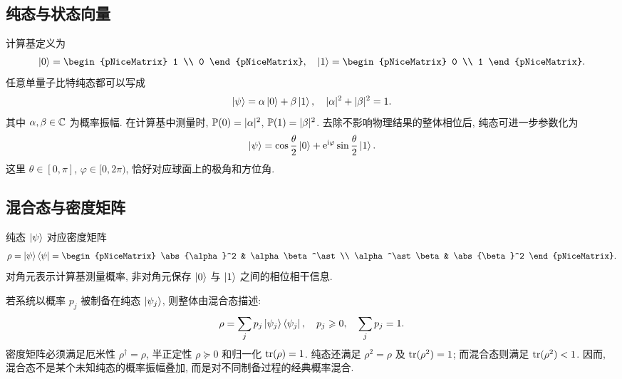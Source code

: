 \documentclass[a4paper]{ctexart}
\begin{document}
\subsection{纯态与状态向量}

计算基定义为
\begin{align}
    \ket{0}=\begin{pNiceMatrix}
                1 \\
                0
            \end{pNiceMatrix}, \q \ket{1}=\begin{pNiceMatrix}
                                              0 \\
                                              1
                                          \end{pNiceMatrix}.
\end{align}
任意单量子比特纯态都可以写成
\begin{align}
    \ket{\psi}=\alpha\ket{0}+\beta\ket{1}, \quad \lvert\alpha\rvert^2+\lvert\beta\rvert^2=1.
\end{align}
其中 $\alpha, \beta\in\mathbb{C}$ 为概率振幅. 在计算基中测量时, $\mathbb{P}(0)=\lvert\alpha\rvert^2$, $\mathbb{P}(1)=\lvert\beta\rvert^2$. 去除不影响物理结果的整体相位后, 纯态可进一步参数化为
\begin{align}
    \ket{\psi}=\cos\frac{\theta}{2}\ket{0}+\mathrm{e}^{\mathrm{i}\varphi}\sin\frac{\theta}{2}\ket{1}.
\end{align}
这里 $\theta\in[0, \pi]$, $\varphi\in[0, 2\pi)$, 恰好对应球面上的极角和方位角.

\subsection{混合态与密度矩阵}

纯态 $\ket{\psi}$ 对应密度矩阵
\begin{align}
    \rho=\ket{\psi}\bra{\psi}=\begin{pNiceMatrix}
                                  \abs{\alpha}^2   & \alpha\beta^\ast \\
                                  \alpha^\ast\beta & \abs{\beta}^2
                              \end{pNiceMatrix}.
\end{align}
对角元表示计算基测量概率, 非对角元保存 $\ket{0}$ 与 $\ket{1}$ 之间的相位相干信息.

若系统以概率 $p_j$ 被制备在纯态 $\ket{\psi_j}$, 则整体由混合态描述:
\begin{align}
    \rho=\sum_j p_j\ket{\psi_j}\bra{\psi_j}, \quad p_j\geqslant 0, \quad \sum_j p_j=1.
\end{align}
密度矩阵必须满足厄米性 $\rho^\dagger=\rho$, 半正定性 $\rho\succeq0$ 和归一化 $\operatorname{tr}(\rho)=1$. 纯态还满足 $\rho^2=\rho$ 及 $\operatorname{tr}(\rho^2)=1$; 而混合态则满足 $\operatorname{tr}(\rho^2)<1$. 因而, 混合态不是某个未知纯态的概率振幅叠加, 而是对不同制备过程的经典概率混合.
\end{document}
